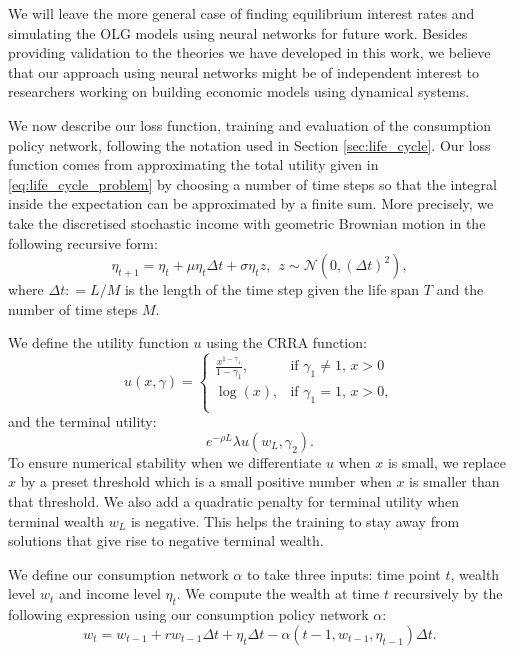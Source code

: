 \documentclass[11pt,oneside,english,reqno,dvipsnames,table]{amsart}
\numberwithin{equation}{section}
\theoremstyle{plain}
\theoremstyle{definition}
\theoremstyle{remark}
\theoremstyle{plain}
\theoremstyle{plain}
\theoremstyle{plain}
\theoremstyle{plain}
\theoremstyle{plain}
\theoremstyle{plain}
\theoremstyle{plain}
\newcommand{\cN}{\mathcal{N}}
\numberwithin{thm}{section}
\begin{document}
We will leave the more general case of finding equilibrium interest rates and simulating the OLG models using neural networks for future work. Besides providing validation to the theories we have developed in this work, we believe that our approach using neural networks might be of independent interest to researchers working on building economic models using dynamical systems.  

We now describe our loss function, training and evaluation of the consumption policy network, following the notation used in Section \ref{sec:life_cycle}. Our loss function comes from approximating the total utility given in \eqref{eq:life_cycle_problem} by choosing a number of time steps so that the integral inside the expectation can be approximated by a finite sum. More precisely, we take the discretised stochastic income with geometric Brownian motion in the following recursive form:
\begin{equation*}
    \eta_{t+1} = \eta_{t} + \mu 
    \eta_t \Delta t + \sigma \eta_t z, \ \ z \sim \cN(0, (\Delta t)^2 ),
\end{equation*}
where $\Delta t : = L /M$ is the length of the time step given the life span $T$ and the number of time steps $M$.

We define the utility function $u$ using the CRRA function:
\begin{equation*}
u(x, \gamma) = 
    \begin{cases}
    \frac{x^{1-\gamma_1}}{1-\gamma_1}, & \text{if } \gamma_1 \neq 1, \, x > 0 \\
    \log(x), & \text{if } \gamma_1 = 1,  \, x > 0,\\
    \end{cases}
\end{equation*} 
and the terminal utility:
\begin{equation*}
    e^{-\rho L} \lambda u(w_L, \gamma_2).
\end{equation*} 
To ensure numerical stability when we differentiate $u$ when $x$ is small, we replace $x$ by a preset threshold which is a small positive number when $x$ is smaller than that threshold. We also add a quadratic penalty for terminal utility when terminal wealth $w_L$ is negative. This helps the training to stay away from solutions that give rise to negative terminal wealth.   

We define our consumption network $\alpha$ to take three inputs: time point $t$, wealth level $w_t$ and income level $\eta_t$. We compute the wealth at time $t$ recursively by the following expression using our consumption policy network $\alpha$:
\begin{equation}\label{eq:wealth process}
    w_t = w_{t-1} + r w_{t-1} \Delta t + \eta_t \Delta t - \alpha(t-1, w_{t-1}, \eta_{t-1}) \Delta t.
\end{equation}
\end{document}
